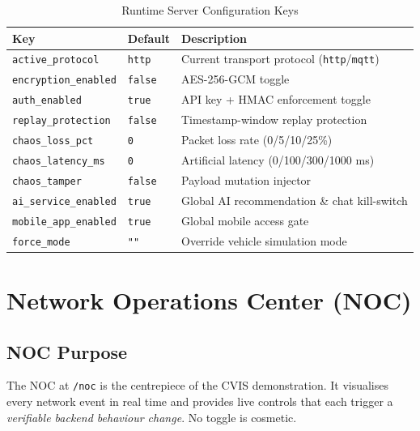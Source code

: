 \documentclass[12pt,a4paper]{report}
\begin{document}
\begin{table}[H]
\centering
\caption{Runtime Server Configuration Keys}
\label{tab:config}
\begin{tabularx}{\textwidth}{L{4cm} L{2.5cm} X}
\toprule
\textbf{Key} & \textbf{Default} & \textbf{Description} \\
\midrule
\texttt{active\_protocol} & \texttt{http} & Current transport protocol (\texttt{http}/\texttt{mqtt}) \\
\texttt{encryption\_enabled} & \texttt{false} & AES-256-GCM toggle \\
\texttt{auth\_enabled} & \texttt{true} & API key + HMAC enforcement toggle \\
\texttt{replay\_protection} & \texttt{false} & Timestamp-window replay protection \\
\texttt{chaos\_loss\_pct} & \texttt{0} & Packet loss rate (0/5/10/25\%) \\
\texttt{chaos\_latency\_ms} & \texttt{0} & Artificial latency (0/100/300/1000 ms) \\
\texttt{chaos\_tamper} & \texttt{false} & Payload mutation injector \\
\texttt{ai\_service\_enabled} & \texttt{true} & Global AI recommendation \& chat kill-switch \\
\texttt{mobile\_app\_enabled} & \texttt{true} & Global mobile access gate \\
\texttt{force\_mode} & \texttt{""} & Override vehicle simulation mode \\
\bottomrule
\end{tabularx}
\end{table}

\chapter{Network Operations Center (NOC)}

\section{NOC Purpose}

The NOC at \texttt{/noc} is the centrepiece of the CVIS demonstration. It visualises every network event in real time and provides live controls that each trigger a \textit{verifiable backend behaviour change}. No toggle is cosmetic.
\end{document}
